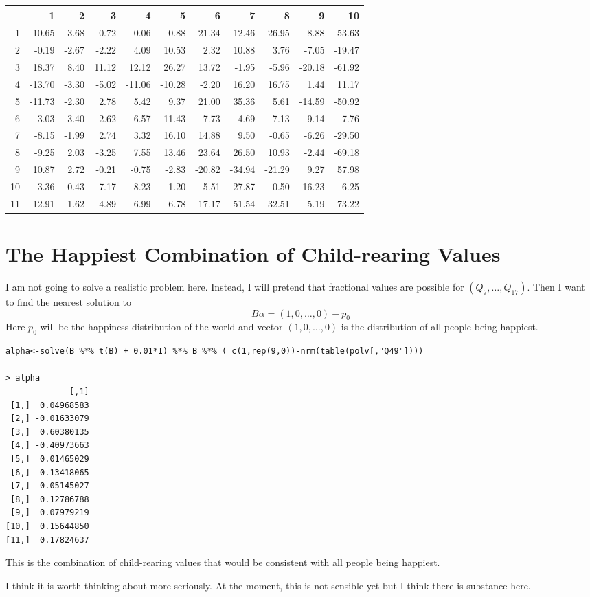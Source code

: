 \documentclass{amsart}
\begin{document}
\begin{table}[ht]
\centering
\begin{tabular}{rrrrrrrrrrr}
  \hline
 & 1 & 2 & 3 & 4 & 5 & 6 & 7 & 8 & 9 & 10 \\ 
  \hline
1 & 10.65 & 3.68 & 0.72 & 0.06 & 0.88 & -21.34 & -12.46 & -26.95 & -8.88 & 53.63 \\ 
  2 & -0.19 & -2.67 & -2.22 & 4.09 & 10.53 & 2.32 & 10.88 & 3.76 & -7.05 & -19.47 \\ 
  3 & 18.37 & 8.40 & 11.12 & 12.12 & 26.27 & 13.72 & -1.95 & -5.96 & -20.18 & -61.92 \\ 
  4 & -13.70 & -3.30 & -5.02 & -11.06 & -10.28 & -2.20 & 16.20 & 16.75 & 1.44 & 11.17 \\ 
  5 & -11.73 & -2.30 & 2.78 & 5.42 & 9.37 & 21.00 & 35.36 & 5.61 & -14.59 & -50.92 \\ 
  6 & 3.03 & -3.40 & -2.62 & -6.57 & -11.43 & -7.73 & 4.69 & 7.13 & 9.14 & 7.76 \\ 
  7 & -8.15 & -1.99 & 2.74 & 3.32 & 16.10 & 14.88 & 9.50 & -0.65 & -6.26 & -29.50 \\ 
  8 & -9.25 & 2.03 & -3.25 & 7.55 & 13.46 & 23.64 & 26.50 & 10.93 & -2.44 & -69.18 \\ 
  9 & 10.87 & 2.72 & -0.21 & -0.75 & -2.83 & -20.82 & -34.94 & -21.29 & 9.27 & 57.98 \\ 
  10 & -3.36 & -0.43 & 7.17 & 8.23 & -1.20 & -5.51 & -27.87 & 0.50 & 16.23 & 6.25 \\ 
  11 & 12.91 & 1.62 & 4.89 & 6.99 & 6.78 & -17.17 & -51.54 & -32.51 & -5.19 & 73.22 \\ 
   \hline
\end{tabular}
\end{table}

\section{The Happiest Combination of Child-rearing Values}

I am not going to solve a realistic problem here.  Instead, I will pretend that fractional values are possible for $(Q_7,\dots, Q_{17})$.  Then I want to find the nearest solution to 
\[
B\alpha = (1,0,\dots,0)-p_0
\]
Here $p_0$ will be the happiness distribution of the world and vector $(1,0,\dots,0)$ is the distribution of all people being happiest.  

\begin{verbatim}
alpha<-solve(B %*% t(B) + 0.01*I) %*% B %*% ( c(1,rep(9,0))-nrm(table(polv[,"Q49"])))

> alpha
             [,1]
 [1,]  0.04968583
 [2,] -0.01633079
 [3,]  0.60380135
 [4,] -0.40973663
 [5,]  0.01465029
 [6,] -0.13418065
 [7,]  0.05145027
 [8,]  0.12786788
 [9,]  0.07979219
[10,]  0.15644850
[11,]  0.17824637
\end{verbatim}
This is the combination of child-rearing values that would be consistent with all people being happiest.

I think it is worth thinking about more seriously.  At the moment, this is not sensible yet but I think there is substance here.  
\end{document}
